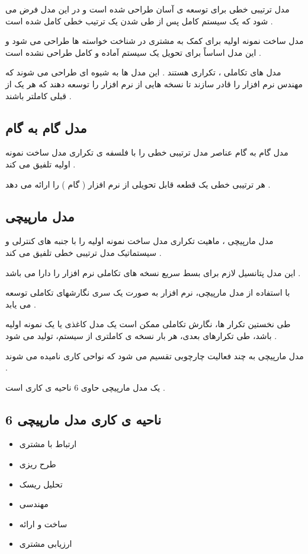 \documentclass{article}
\begin{document}
مدل ترتیبی خطی برای توسعه ی آسان طراحی شده است و در این مدل فرض می شود که یک سیستم کامل پس از طی شدن یک ترتیب خطی کامل شده است .

مدل ساخت نمونه اولیه برای کمک به مشتری در شناخت خواسته ها طراحی می شود و این مدل اساساً برای تحویل یک سیستم آماده و کامل طراحی نشده است .

مدل های تکاملی ، تکراری هستند . این مدل ها به شیوه ای طراحی می شوند که مهندس نرم افزار را قادر سازند تا نسخه هایی از نرم افزار را توسعه دهند که هر یک از قبلی کاملتر باشند .



\subsection{مدل گام به گام}

مدل گام به گام عناصر مدل ترتیبی خطی را با فلسفه ی تکراری مدل ساخت نمونه اولیه تلفیق می کند .

هر ترتیبی خطی یک قطعه قابل تحویلی از نرم افزار ( گام ) را ارائه می دهد .


\subsection{مدل مارپیچی}
مدل مارپیچی ، ماهیت تکراری مدل ساخت نمونه اولیه را با جنبه های کنترلی و سیستماتیک مدل ترتیبی خطی تلفیق می کند .

این مدل پتانسیل لازم برای بسط سریع نسخه های تکاملی نرم افزار را دارا می باشد . 

با استفاده از مدل مارپیچی، نرم افزار به صورت یک سری نگارشهای تکاملی توسعه می یابد .

طی نخستین تکرار ها، نگارش تکاملی ممکن است یک مدل کاغذی یا یک نمونه اولیه باشد، طی تکرارهای بعدی، هر بار نسخه ی کاملتری از سیستم، تولید می شود .

مدل مارپیچی به چند فعالیت چارچوبی تقسیم می شود که نواحی کاری نامیده می شوند .

یک مدل مارپیچی حاوی 6 ناحیه ی کاری است .

\subsection{6 ناحیه ی کاری مدل مارپیچی}

\begin{itemize}
	\item ارتباط با مشتری
	\item طرح ریزی
	\item تحلیل ریسک
	\item مهندسی
	\item ساخت و ارائه
	\item ارزیابی مشتری
\end{itemize}
\end{document}
